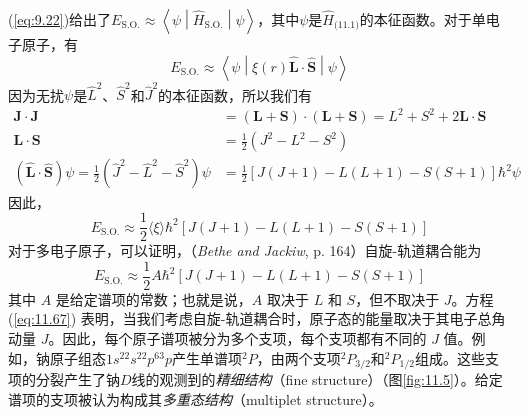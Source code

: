     (\ref{eq:9.22})给出了$E_{\text{S.O.}} \approx \left\langle \psi \middle| \hat{H}_{\text{S.O.}} \middle| \psi \right\rangle$，其中$\psi$是$\hat{H}_{\text{(11.1)}}$的本征函数。对于单电子原子，有
    \begin{equation}
        E_{\text{S.O.}} \approx \left\langle \psi \middle| \xi\left(r\right) \hat{\mathbf{L}} \cdot \hat{\mathbf{S}} \middle| \psi \right\rangle
        \label{eq:11.65}
    \end{equation}
    因为无扰$\psi$是$\hat{L}^2$、$\hat{S}^2$和$\hat{J}^2$的本征函数，所以我们有
    \begin{equation*}
        \begin{aligned}
            \mathbf{J} \cdot \mathbf{J} &= \left(\mathbf{L} + \mathbf{S}\right) \cdot \left(\mathbf{L} + \mathbf{S}\right) = L^2 + S^2 + 2 \mathbf{L} \cdot \mathbf{S} \\
            \mathbf{L} \cdot \mathbf{S} &= \frac{1}{2}\left(J^2 - L^2 - S^2\right) \\
            \left(\hat{\mathbf{L}} \cdot \hat{\mathbf{S}}\right)\psi = \frac{1}{2} \left(\hat{J}^{2} - \hat{L}^{2} - \hat{S}^{2}\right) \psi &= \frac{1}{2} \left[J\left(J+1\right) - L\left(L+1\right) - S\left(S+1\right)\right]\hbar^{2}\psi
        \end{aligned}
    \end{equation*}
    因此，
    \begin{equation}
        E_{\text{S.O.}} \approx \frac{1}{2} \langle \xi \rangle \hbar^2 \left[ J\left(J+1\right) - L\left(L+1\right) - S\left(S+1\right) \right]
        \label{eq:11.66}
    \end{equation}
    对于多电子原子，可以证明，（\textit{Bethe and Jackiw}, p. 164）自旋-轨道耦合能为
    \begin{equation}
        E_{\text{S.O.}} \approx \frac{1}{2}A\hbar^2\left[ J\left(J+1\right) - L\left(L+1\right) - S\left(S+1\right) \right]
        \label{eq:11.67}
    \end{equation}
    其中 $A$ 是给定谱项的常数；也就是说，$A$ 取决于 $L$ 和 $S$，但不取决于 $J$。方程 (\ref{eq:11.67}) 表明，当我们考虑自旋-轨道耦合时，原子态的能量取决于其电子总角动量 $J$。因此，每个原子谱项被分为多个支项，每个支项都有不同的 $J$ 值。例如，钠原子组态$1s^22s^22p^63p$产生单谱项$^2P$，由两个支项$^2P_{3/2}$和$^2P_{1/2}$组成。这些支项的分裂产生了钠$D$线的观测到的\textit{精细结构}（fine structure）（图\ref{fig:11.5}）。给定谱项的支项被认为构成其\textit{多重态结构}（multiplet structure）。

